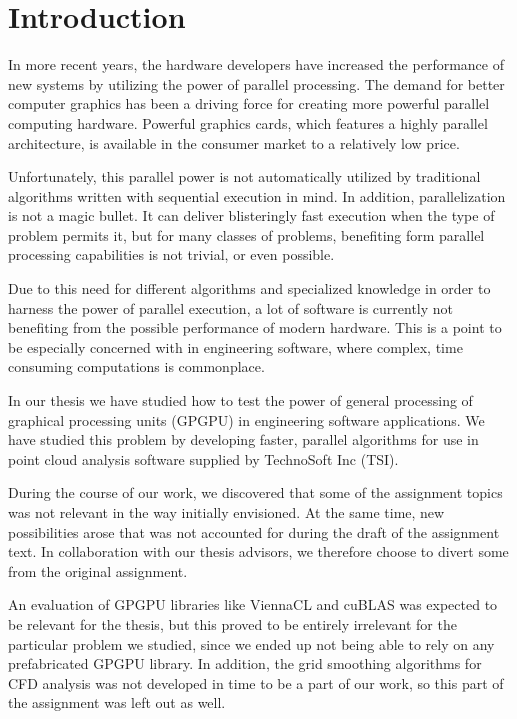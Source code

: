 \chapter{Introduction}

In more recent years, the hardware developers have increased the performance of new systems by utilizing the power of parallel processing. The demand for better computer graphics has been a driving force for creating more powerful parallel computing hardware. Powerful graphics cards, which features a highly parallel architecture, is available in the consumer market to a relatively low price.

Unfortunately, this parallel power is not automatically utilized by traditional algorithms written with sequential execution in mind. In addition, parallelization is not a magic bullet. It can deliver blisteringly fast execution when the type of problem permits it, but for many classes of problems, benefiting form parallel processing capabilities is not trivial, or even possible.

Due to this need for different algorithms and specialized knowledge in order to harness the power of parallel execution, a lot of software is currently not benefiting from the possible performance of modern hardware. This is a point to be especially concerned with in engineering software, where complex, time consuming computations is commonplace.

In our thesis we have studied how to test the power of general processing of graphical processing units (GPGPU) in engineering software applications. We have studied this problem by developing faster, parallel algorithms for use in point cloud analysis software supplied by TechnoSoft Inc (TSI).

During the course of our work, we discovered that some of the assignment topics was not relevant in the way initially envisioned. At the same time, new possibilities arose that was not accounted for during the draft of the assignment text. In collaboration with our thesis advisors, we therefore choose to divert some from the original assignment.

An evaluation of GPGPU libraries like ViennaCL and cuBLAS was expected to be relevant for the thesis, but this proved to be entirely irrelevant for the particular problem we studied, since we ended up not being able to rely on any prefabricated GPGPU library. In addition, the grid smoothing algorithms for CFD analysis was not developed in time to be a part of our work, so this part of the assignment was left out as well.

